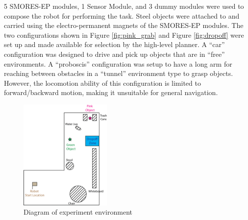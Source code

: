 \documentclass[conference]{IEEEtran}
\begin{document}
5 SMORES-EP modules, 1 Sensor Module, and 3 dummy modules were used to compose the robot for performing the task. Steel objects were attached to and carried using the electro-permanent magnets of the SMORES-EP modules. The two configurations shown in Figure \ref{fig:pink_grab} and Figure \ref{fig:dropoff} were set up and made available for selection by the high-level planner. A ``car'' configuration was designed to drive and pick up objects that are in ``free'' environments. A ``proboscis'' configuration was setup to have a long arm for reaching between obstacles in a ``tunnel'' environment type to grasp objects. However, the locomotion ability of this configuration is limited to forward/backward motion, making it unsuitable for general navigation.

\begin{figure}
\begin{center}
\includegraphics[width=0.4\textwidth]{images/RSSMap.png}
\caption{Diagram of experiment environment}
\label{fig:map}
\end{center}
\end{figure}
\end{document}
